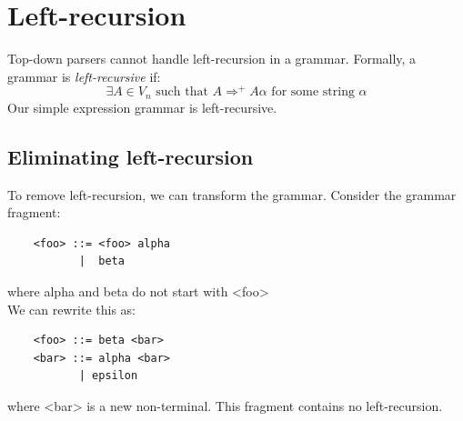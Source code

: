 \documentclass[10pt]{article}
\begin{document}
\section*{Left-recursion}
Top-down parsers cannot handle left-recursion in a grammar.  Formally, a grammar is \textit{left-recursive} if:
\[\exists A \in V_n \text{ such that } A \Rightarrow^+ A\alpha \text{ for some string } \alpha\]
Our simple expression grammar is left-recursive.
\subsection*{Eliminating left-recursion}
To remove left-recursion, we can transform the grammar.  Consider the grammar fragment:
\begin{verbatim}
    <foo> ::= <foo> alpha
           |  beta
\end{verbatim}
where alpha and beta do not start with <foo>\\
We can rewrite this as:
\begin{verbatim}
    <foo> ::= beta <bar>
    <bar> ::= alpha <bar>
           | epsilon
\end{verbatim}
where <bar> is a new non-terminal.  This fragment contains no left-recursion.
\end{document}

